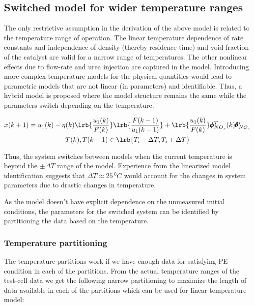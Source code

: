 \subsection{Switched model for wider temperature ranges}

The only restrictive assumption in the derivation of the above model is related to the temperature range of operation.
The linear temperature dependence of rate constants and independence of density (thereby residence time) and void
fraction of the catalyst are valid for a narrow range of temperatures. The other nonlinear effects due to flow-rate and
urea injection are captured in the model. Introducing more complex temperature models for the physical quantities would
lead to parametric models that are not linear (in parameters) and identifiable. Thus, a hybrid model is proposed where
the model structure remains the same while the parameters switch depending on the temperature.

\begin{multline}
        x(k+1) = u_1(k) - \eta(k) \lrb{\frac{u_1(k)}{F(k)}} \lrb{\frac{F(k-1)}{u_1(k-1)}}
                        + \lrb{\frac{u_1(k)}{F(k)}} \pmb \phi^{T}_{NO_x}(k) \pmb \theta^i_{NO_x}
        \\
        T(k), T(k-1) \in \lrb{T_i-\Delta T, T_i + \Delta T}
\end{multline}

Thus, the system switches between models when the current temperature is beyond the $\pm \Delta T$ range of the model.
Experience from the linearized model identification suggests that $\Delta T \approx 25 \, ^0C$ would account for
the changes in system parameters due to drastic changes in temperature.

As the model doesn't have explicit dependence on the unmeasured initial conditions, the parameters for the switched system can be identified by partitioning the data based on the temperature.

\subsubsection{Temperature partitioning}

The temperature partitions work if we have enough data for satisfying PE condition in each of the partitions. From the actual temperature ranges of the test-cell data we get the following narrow partitioning to maximize the length of data available in each of the partitions which can be used for linear temperature model:

